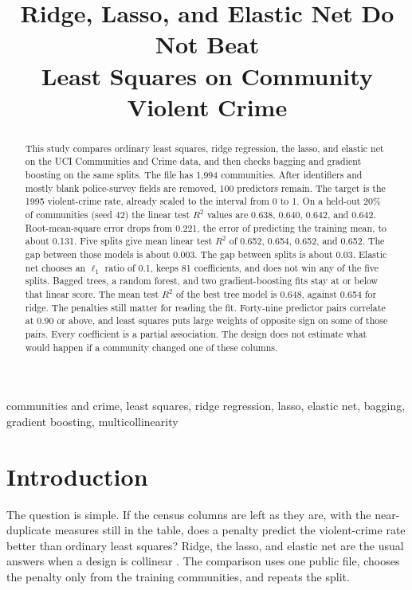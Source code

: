 \documentclass[conference]{IEEEtran}
\begin{document}
\title{Ridge, Lasso, and Elastic Net Do Not Beat\\
Least Squares on Community Violent Crime}

\author{
}

\maketitle

\begin{abstract}
This study compares ordinary least squares, ridge regression, the lasso, and elastic net on the UCI Communities and Crime data, and then checks bagging and gradient boosting on the same splits.
The file has 1{,}994 communities.
After identifiers and mostly blank police-survey fields are removed, 100 predictors remain.
The target is the 1995 violent-crime rate, already scaled to the interval from 0 to 1.
On a held-out 20\% of communities (seed 42) the linear test $R^{2}$ values are 0.638, 0.640, 0.642, and 0.642.
Root-mean-square error drops from 0.221, the error of predicting the training mean, to about 0.131.
Five splits give mean linear test $R^{2}$ of 0.652, 0.654, 0.652, and 0.652.
The gap between those models is about 0.003.
The gap between splits is about 0.03.
Elastic net chooses an $\ell_1$ ratio of 0.1, keeps 81 coefficients, and does not win any of the five splits.
Bagged trees, a random forest, and two gradient-boosting fits stay at or below that linear score.
The mean test $R^{2}$ of the best tree model is 0.648, against 0.654 for ridge.
The penalties still matter for reading the fit.
Forty-nine predictor pairs correlate at 0.90 or above, and least squares puts large weights of opposite sign on some of those pairs.
Every coefficient is a partial association.
The design does not estimate what would happen if a community changed one of these columns.
\end{abstract}

\begin{IEEEkeywords}
communities and crime, least squares, ridge regression, lasso, elastic net, bagging, gradient boosting, multicollinearity
\end{IEEEkeywords}

\section{Introduction}
The question is simple.
If the census columns are left as they are, with the near-duplicate measures still in the table, does a penalty predict the violent-crime rate better than ordinary least squares?
Ridge, the lasso, and elastic net are the usual answers when a design is collinear \cite{hoerl1970,tibshirani1996,zou2005}.
The comparison uses one public file, chooses the penalty only from the training communities, and repeats the split.
\end{document}
